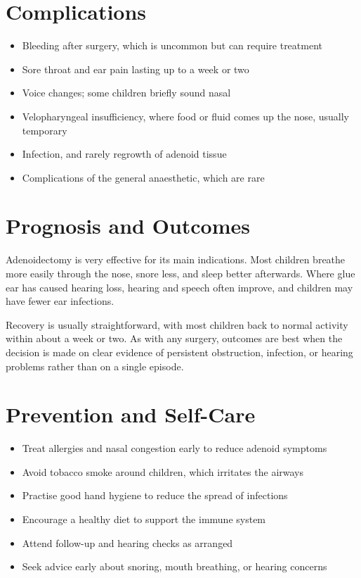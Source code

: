 \section*{Complications}
\begin{itemize}
    \item Bleeding after surgery, which is uncommon but can require treatment
    \item Sore throat and ear pain lasting up to a week or two
    \item Voice changes; some children briefly sound nasal
    \item Velopharyngeal insufficiency, where food or fluid comes up the nose, usually temporary
    \item Infection, and rarely regrowth of adenoid tissue
    \item Complications of the general anaesthetic, which are rare
\end{itemize}

\section*{Prognosis and Outcomes}
Adenoidectomy is very effective for its main indications. Most children breathe more easily through the nose, snore less, and sleep better afterwards. Where glue ear has caused hearing loss, hearing and speech often improve, and children may have fewer ear infections.

Recovery is usually straightforward, with most children back to normal activity within about a week or two. As with any surgery, outcomes are best when the decision is made on clear evidence of persistent obstruction, infection, or hearing problems rather than on a single episode.

\section*{Prevention and Self-Care}
\begin{itemize}
    \item Treat allergies and nasal congestion early to reduce adenoid symptoms
    \item Avoid tobacco smoke around children, which irritates the airways
    \item Practise good hand hygiene to reduce the spread of infections
    \item Encourage a healthy diet to support the immune system
    \item Attend follow-up and hearing checks as arranged
    \item Seek advice early about snoring, mouth breathing, or hearing concerns
\end{itemize}


